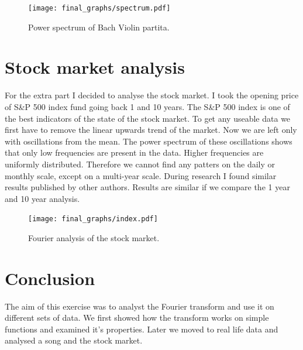 \documentclass[12pt, a4paper]{article}
\begin{document}
\begin{figure}[hbtp]
  \begin{center}
  \texttt{[image: final\_graphs/spectrum.pdf]}
  \caption{Power spectrum of Bach Violin partita.}
  \end{center}
\end{figure}

\section{Stock market analysis}

For the extra part I decided to analyse the stock market. I took the opening price of S\&P 500 index fund going back 1 and 10 years. The S\&P 500 index is one of the best indicators of the state of the stock market. To get any useable data we first have to remove the linear upwards trend of the market. Now we are left only with oscillations from the mean. The power spectrum of these oscillations shows that only low frequencies are present in the data. Higher frequencies are uniformly distributed. Therefore we cannot find any patters on the daily or monthly scale, except on a multi-year scale. During research I found similar results published by other authors. Results are similar if we compare the 1 year and 10 year analysis.

\begin{figure}[hbtp]
  \begin{center}
  \texttt{[image: final\_graphs/index.pdf]}
  \caption{Fourier analysis of the stock market.}
  \end{center}
\end{figure}

\section{Conclusion}
The aim of this exercise was to analyst the Fourier transform and use it on different sets of data. We first showed how the transform works on simple functions and examined it's properties. Later we moved to real life data and analysed a song and the stock market.
\end{document}
